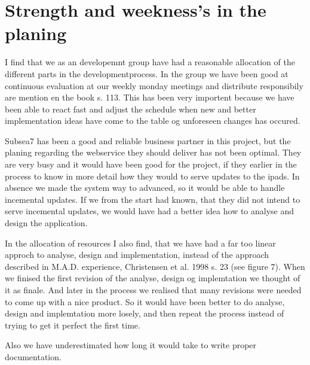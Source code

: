 \section{Strength and weekness's in the planing}
I find that we as an developemnt group have had a reasonable allocation of the different
parts in the developmentprocess. In the group we have been good at continuous evaluation 
at our weekly monday meetings and distribute responsibily are mention en the book s. 113. 
This has been very importent because we have been able to 
react fast and adjust the schedule when new and better implementation ideas have come to 
the table og unforeseen changes has occured.

Subsea7 has been a good and reliable business partner in this project, but the planing 
regarding the webservice they should deliver has not been optimal. 
They are very busy and it would have been good for the project, if they  earlier in the process to know in more detail how they would to serve updates to the ipads. In absence we made the system way to advanced, so it would be able to handle incemental updates. If we from the start had known, that they did not intend to serve incemental updates, we would have had a better idea how to analyse and design the application.

In the allocation of resources I also find, that we have had a far too linear approch to analyse, design and implementation, instead of the approach described in M.A.D. experience, Christensen et al. 1998 s. 23
(see figure 7). When we finised the first revision of the analyse, design og implemtation we thought of
it as finale. And later in the process we realised that many revisions were needed to come up with a nice product. So it would have been better to do analyse, design and implemtation more losely, and then repeat the process instead of trying to get it perfect the first time.

Also we have underestimated how long it would take to write proper documentation.

